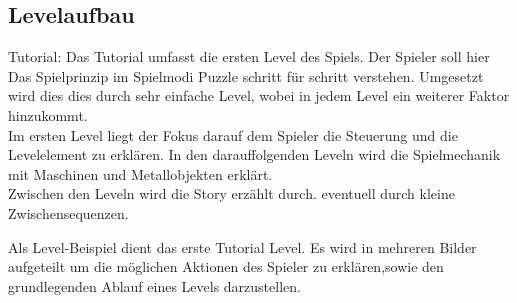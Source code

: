 \documentclass{scrartcl}
\begin{document}
\begin{description}
\end{description}

\subsection{Levelaufbau}  \label{subsection:Levelaufbau}


\begin{description}
	
	\begin{minipage}{1\textwidth}
		\item[Tutorial:] \label{Levelaufbau:Tutorial}  Das Tutorial umfasst die ersten Level des Spiels. Der Spieler soll hier Das Spielprinzip im Spielmodi Puzzle  schritt für schritt verstehen.
		Umgesetzt wird dies dies durch sehr einfache Level, wobei in jedem Level ein weiterer Faktor hinzukommt.\\
		Im ersten Level liegt der Fokus darauf dem Spieler die Steuerung und die Levelelement zu erklären. 
		In den darauffolgenden Leveln wird die Spielmechanik mit Maschinen und Metallobjekten erklärt.\\
		Zwischen den Leveln wird die Story erzählt durch. eventuell durch kleine Zwischensequenzen.\\		 
	\end{minipage}
		

	\item[Levelbeispiel:] \label{Levelaufbau:Levelbeispiel} Als Level-Beispiel dient das erste Tutorial Level. Es wird in mehreren Bilder aufgeteilt um die möglichen Aktionen des Spieler zu erklären,sowie den grundlegenden Ablauf eines Levels darzustellen.\\
	

\end{description}
\end{document}
